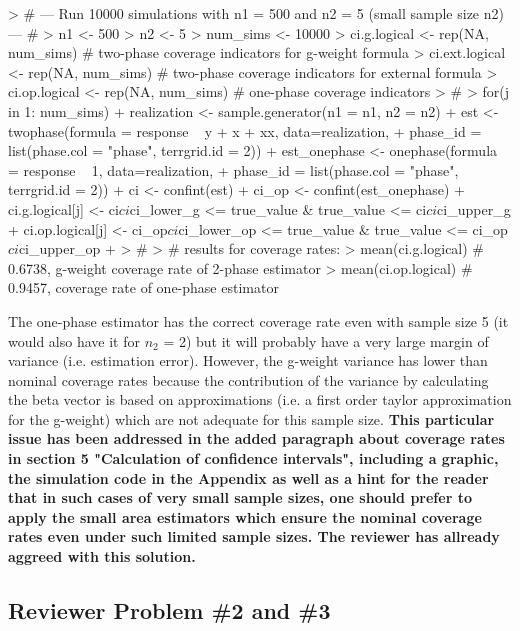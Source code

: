 \documentclass{article}
\begin{document}
\begin{small}
\begin{Schunk}
\begin{Sinput}
> # --- Run 10000 simulations with n1 = 500 and n2 = 5 (small sample size n2) --- #
> n1 <- 500
> n2 <- 5
> num_sims <- 10000
> ci.g.logical <- rep(NA, num_sims) # two-phase coverage indicators for g-weight formula
> ci.ext.logical <- rep(NA, num_sims) # two-phase coverage indicators for external formula
> ci.op.logical <- rep(NA, num_sims) # one-phase coverage indicators
> #
> for(j in 1: num_sims){
+ realization <- sample.generator(n1 = n1, n2 = n2)
+ est <- twophase(formula = response ~ y + x + xx, data=realization,
+ phase_id = list(phase.col = "phase", terrgrid.id = 2))
+ est_onephase <- onephase(formula = response ~ 1, data=realization,
+ phase_id = list(phase.col = "phase", terrgrid.id = 2))
+ ci <- confint(est)
+ ci_op <- confint(est_onephase)
+ ci.g.logical[j] <- ci$ci$ci_lower_g <= true_value & true_value <= ci$ci$ci_upper_g
+ ci.op.logical[j] <- ci_op$ci$ci_lower_op <= true_value & true_value <= ci_op$ci$ci_upper_op
+ }
> #
> # results for coverage rates:
> mean(ci.g.logical) # 0.6738, g-weight coverage rate of 2-phase estimator
> mean(ci.op.logical) # 0.9457, coverage rate of one-phase estimator
\end{Sinput}
\end{Schunk}
\end{small}

The one-phase estimator has the correct coverage rate even with sample size 5 (it would also have it for $n_2$ = 2) but it will probably have a very large margin of variance (i.e. estimation error). However, the g-weight variance has lower than nominal coverage rates because the contribution of the variance by calculating the beta vector is based on approximations (i.e. a first order taylor approximation for the g-weight) which are not adequate for this sample size. \textbf{This particular issue has been addressed in the added paragraph about coverage rates in section 5 "Calculation of confidence intervals", including a graphic, the simulation code in the Appendix as well as a hint for the reader that in such cases of very small sample sizes, one should prefer to apply the small area estimators which ensure the nominal coverage rates even under such limited sample sizes. The reviewer has allready aggreed with this solution.}


\subsection*{Reviewer Problem \#2 and \#3}
\end{document}
